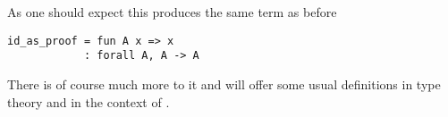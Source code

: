 As one should expect this produces the same term as before
\begin{verbatim}
id_as_proof = fun A x => x
            : forall A, A -> A
\end{verbatim}

There is of course much more to it and  will offer some
usual definitions in type theory and in the context of \Coq.